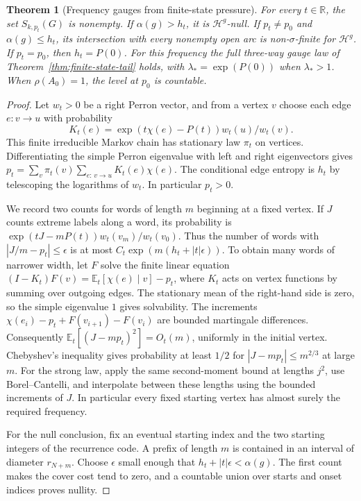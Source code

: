\documentclass[11pt]{article}
\newtheorem{theorem}{Theorem}
\theoremstyle{definition}
\theoremstyle{remark}
\newcommand{\R}{\mathbb{R}}
\begin{document}
\begin{theorem}[Frequency gauges from finite-state pressure]\label{thm:pressure-frequency}
For every $t\in\R$, the set $S_{k,p_t}(G)$ is nonempty.
If $\alpha(g)>h_t$, it is $\mathcal H^g$-null.
If $p_t\ne p_0$ and $\alpha(g)\le h_t$, its intersection with every
nonempty open arc is non-$\sigma$-finite for $\mathcal H^g$.
If $p_t=p_0$, then $h_t=P(0)$. For this frequency the full three-way
gauge law of Theorem~\ref{thm:finite-state-tail} holds, with
$\lambda_*=\exp(P(0))$ when $\lambda_*>1$.
When $\rho(A_0)=1$, the level at $p_0$ is countable.
\end{theorem}

\begin{proof}
Let $w_t>0$ be a right Perron vector, and from a vertex $v$ choose each
edge $e:v\to u$ with probability
\[
 K_t(e)=\exp(t\chi(e)-P(t))w_t(u)/w_t(v).
\]
This finite irreducible Markov chain has stationary law $\pi_t$ on
vertices. Differentiating the simple Perron eigenvalue with left and
right eigenvectors gives
$p_t=\sum_v\pi_t(v)\sum_{e:\,v\to u}K_t(e)\chi(e)$.
The conditional edge entropy is $h_t$ by telescoping the logarithms
of $w_t$. In particular $p_t>0$.

We record two counts for words of length $m$ beginning at a fixed
vertex. If $J$ counts extreme labels along a word, its probability is
$\exp(tJ-mP(t))w_t(v_m)/w_t(v_0)$. Thus the number of words with
$|J/m-p_t|\le\epsilon$ is at most
$C_t\exp(m(h_t+|t|\epsilon))$. To obtain many words of narrower
width, let $F$ solve the finite linear equation
$(I-K_t)F(v)=\mathbb E_t[\chi(e)\mid v]-p_t$, where $K_t$
acts on vertex functions by summing over outgoing edges.
The stationary mean of the right-hand side is zero, so
the simple eigenvalue $1$ gives solvability. The increments
$\chi(e_i)-p_t+F(v_{i+1})-F(v_i)$ are bounded martingale differences.
Consequently $\mathbb E_t[(J-mp_t)^2]=O_t(m)$, uniformly in
the initial vertex. Chebyshev's inequality gives probability
at least $1/2$ for $|J-mp_t|\le m^{2/3}$ at large $m$.
For the strong law, apply the same second-moment bound at lengths
$j^2$, use Borel--Cantelli, and interpolate between these lengths
using the bounded increments of $J$. In particular every fixed
starting vertex has almost surely the required frequency.

For the null conclusion, fix an eventual starting index and the
two starting integers of the recurrence code. A prefix of length
$m$ is contained in an interval of diameter $r_{N+m}$.
Choose $\epsilon$ small enough that
$h_t+|t|\epsilon<\alpha(g)$. The first count makes the cover cost
tend to zero, and a countable union over starts and onset indices
proves nullity.


\end{proof}
\end{document}
